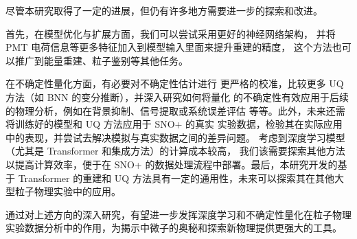 尽管本研究取得了一定的进展，但仍有许多地方需要进一步的探索和改进。

首先，在模型优化与扩展方面，我们可以尝试采用更好的神经网络架构，
并将 PMT 电荷信息等更多特征加入到模型输入里面来提升重建的精度，
这个方法也可以推广到能量重建、粒子鉴别等其他任务。

在不确定性量化方面，有必要对不确定性估计进行
更严格的校准，比较更多 UQ 方法（如 BNN 的变分推断），并深入研究如何将量化
的不确定性有效应用于后续的物理分析，例如在背景抑制、信号提取或系统误差评估
等等。此外，未来还需将训练好的模型和 UQ 方法应用于 SNO+ 的真实
实验数据，检验其在实际应用中的表现，并尝试去解决模拟与真实数据之间的差异问题。
考虑到深度学习模型（尤其是 Transformer 和集成方法）的计算成本较高，
我们该需要探索其他方法以提高计算效率，便于在 SNO+ 
的数据处理流程中部署。最后，本研究开发的基于 Transformer 的重建和 UQ 
方法具有一定的通用性，未来可以探索其在其他大型粒子物理实验中的应用。

通过对上述方向的深入研究，有望进一步发挥深度学习和不确定性量化在粒子物理实验数据分析中的作用，为揭示中微子的奥秘和探索新物理提供更强大的工具。






